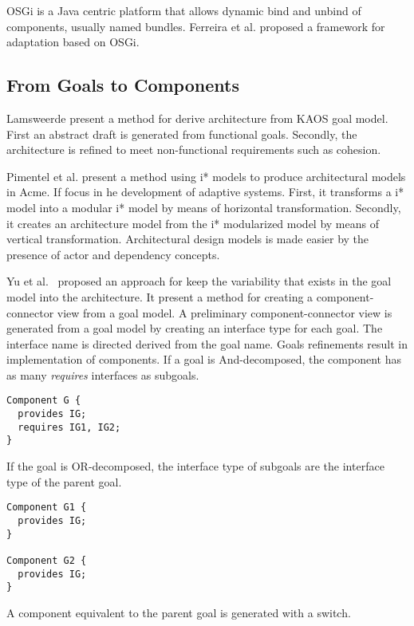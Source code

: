 OSGi\cite{the_osgi_alliance_osgi_2007} is a Java centric platform that allows dynamic bind and unbind of components, usually named bundles. Ferreira et al.\cite{ferreira_-osgi:_2012} proposed a framework for adaptation based on OSGi.

\subsection{From Goals to Components}

Lamsweerde \cite{van_lamsweerde_system_2003} present a method for derive architecture from KAOS goal model. First an abstract draft is generated from functional goals. Secondly, the architecture is refined to meet non-functional requirements such as cohesion.

Pimentel et al. \cite{pimentel_deriving_2012} present a method  using i* models to produce architectural models in Acme. If focus in he development of adaptive systems. First, it transforms a i* model into a modular i* model by means of horizontal transformation. Secondly, it creates an architecture model from the i* modularized model by means of vertical transformation. Architectural design models is made easier by the
presence of actor and dependency concepts.

Yu et al.~\cite{yu_goals_2008} proposed an approach for keep the variability that exists in the goal model into the architecture.
It present a method for creating a component-connector view from a goal model.
A preliminary component-connector view is generated from a goal model by creating an interface type for each goal. The interface name is directed derived from the goal name. Goals refinements result in implementation of components.
If a goal is And-decomposed, the component has as many \emph{requires} interfaces as subgoals.

\begin{lstlisting}
Component G {
  provides IG;
  requires IG1, IG2;
}
\end{lstlisting}

If the goal is OR-decomposed, the interface type of subgoals are the interface type of the parent goal.

\begin{lstlisting}
Component G1 {
  provides IG;
}

Component G2 {
  provides IG;
}
\end{lstlisting}

A component equivalent to the parent goal is generated with a switch.



